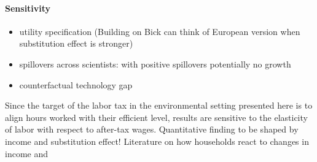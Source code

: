 

\paragraph{Sensitivity}
\begin{itemize}
	\item utility specification (Building on Bick can think of European version when substitution effect is stronger)
	\item spillovers across scientists: with positive spillovers potentially no growth
	\item counterfactual technology gap
\end{itemize}

Since the target of the labor tax in the environmental setting presented here is to align hours worked with their efficient level, results are sensitive to the elasticity of labor with respect to after-tax wages. 
Quantitative finding to be shaped by income and substitution effect!
Literature on how households react to changes in income \cite{Bick2018HowImplications} and \cite{Boppart2019LaborPerspectiveb}




